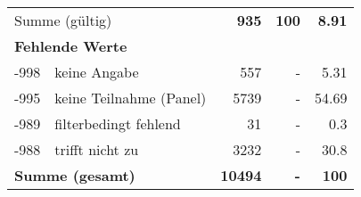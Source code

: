 \begin{longtable}{lXrrr}
     \midrule
     \multicolumn{2}{l}{Summe (gültig)} &
       \textbf{\num{935}} &
     \textbf{\num{100}} &
       \textbf{\num[round-mode=places,round-precision=2]{8.91}} \\
     \multicolumn{5}{l}{\textbf{Fehlende Werte}}\\
       -998 &
       keine Angabe &
         \num{557} &
        - &
         \num[round-mode=places,round-precision=2]{5.31} \\
       -995 &
       keine Teilnahme (Panel) &
         \num{5739} &
        - &
         \num[round-mode=places,round-precision=2]{54.69} \\
       -989 &
       filterbedingt fehlend &
         \num{31} &
        - &
         \num[round-mode=places,round-precision=2]{0.3} \\
       -988 &
       trifft nicht zu &
         \num{3232} &
        - &
         \num[round-mode=places,round-precision=2]{30.8} \\
     \midrule
     \multicolumn{2}{l}{\textbf{Summe (gesamt)}} &
          \textbf{\num{10494}} &
        \textbf{-} &
        \textbf{\num{100}} \\
     \bottomrule
     \end{longtable}
     
